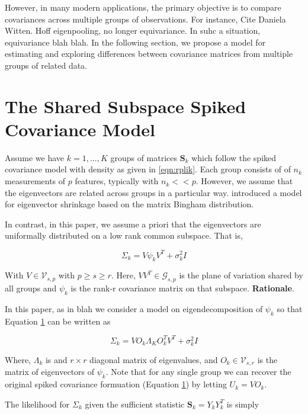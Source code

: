 \documentclass{article}
\newcommand{\bl}[1]{{\mathbf #1}}
\begin{document}
However, in many modern applications, the primary objective is to
compare covariances across multiple groups of observations.  For
instance, Cite
Daniela Witten.  Hoff eigenpooling, no longer equivariance.  In suhc a
situation, equivariance blah blah.  In the following section, we
propose a model for estimating and exploring differences between
covariance matrices from multiple groups of related data.

\section{The Shared Subspace Spiked Covariance Model}

Assume we have $k=1, ..., K$ groups of matrices $\bl S_k$ which follow
the spiked covariance model with density as given in
\ref{eqn:rplik}.    Each group consists of of $n_k$ measurements of $p$ features, typically with $n_k << p$.  However, we assume that the eigenvectors
are related across groups in a particular way.  \citet{Hoff2009}
introduced a model for eigenvector shrinkage based on the matrix Bingham
distribution.  

In contrast, in this paper, we assume a priori that the eigenvectors
are uniformally distributed on a low rank common subspace.  That is, 

\begin{equation}
\Sigma_k = V\psi_kV^T + \sigma^2_kI
\end{equation}

With $V \in \mathcal{V}_{s,p}$ with $p
\geq s \geq r$.  Here, $VV^T \in \mathcal{G}_{s, p}$ is the plane of
variation shared by all groups and $\psi_k$ is the rank-r covariance matrix
on that subspace.  \textbf{Rationale}.  

In this paper, as in blah we consider a model on eigendecomposition of
$\psi_k$ so that Equation \ref{} can be written as

\begin{equation}
\Sigma_k = VO_k\Lambda_KO_k^TV^T + \sigma^2_kI
\end{equation}

Where, $\Lambda_k$ is and $r \times r$ diagonal matrix of eigenvalues,
and $O_k \in \mathcal{V}_{s,r}$ is the matrix of eigenvectors of
$\psi_k$.  Note that for any single group we can recover the original
spiked covariance formuation (Equation
\ref{}) by letting $U_k = VO_k$.

The likelihood for $\Sigma_k$ given the sufficient statistic $\mathbf{S}_k = Y_kY_k^T$ is simply
\end{document}
